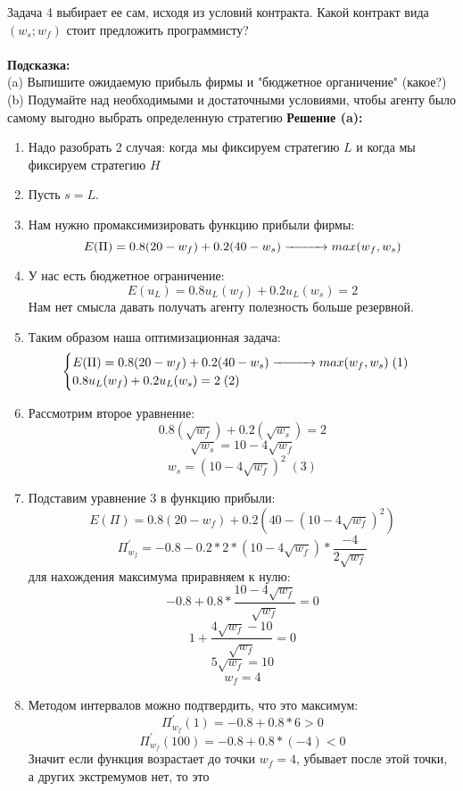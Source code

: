 \begin{mybox}{Задача 4}
    выбирает ее сам, исходя из условий контракта. Какой контракт вида $(w_s;w_f)$ стоит предложить программисту?\\\\
    \textbf{Подсказка:}\\
    \indent\setlength{\parindent}{1em}(a) Выпишите ожидаемую прибыль фирмы и "бюджетное органичение" (какое?)\\
    \indent\setlength{\parindent}{1em}(b) Подумайте над необходимыми и достаточными условиями, чтобы агенту было
    самому выгодно выбрать определенную стратегию
    \tcblower
    \textbf{Решение (a):}
    \begin{enumerate}
        \item Надо разобрать 2 случая: когда мы фиксируем стратегию $L$ и когда мы фиксируем стратегию $H$
        \item Пусть $s=L$.
        \item Нам нужно промаксимизировать функцию прибыли фирмы: $$E(\Pi)=0.8(20-w_f)+0.2(40-w_s)\xrightarrow{\makebox[1cm]{}} max(w_f,w_s)$$
        \item У нас есть бюджетное ограничение: $$E(u_L)=0.8u_L(w_f)+0.2u_L(w_s)=2$$ Нам нет смысла давать получать
        агенту полезность больше резервной.
        \item Таким образом наша оптимизационная задача: $$\begin{cases}
            E(\Pi)=0.8(20-w_f)+0.2(40-w_s)\xrightarrow{\makebox[1cm]{}} max(w_f,w_s) \;(1)\\
            0.8u_L(w_f)+0.2u_L(w_s)=2\; (2) \\
        \end{cases}$$
        \item Рассмотрим второе уравнение: $$0.8(\sqrt{w_f})+0.2(\sqrt{w_s})=2$$
        $$\sqrt{w_s}=10-4\sqrt{w_f}$$
        $$w_s=(10-4\sqrt{w_f})^2\;(3)$$
        \item Подставим уравнение 3 в функцию прибыли: $$E(\Pi)=0.8(20-w_f)+0.2(40-(10-4\sqrt{w_f})^2)$$
        $$\Pi^{'}_{w_f}=-0.8-0.2*2*(10-4\sqrt{w_f})*\frac{-4}{2\sqrt{w_f}}$$ для нахождения максимума приравняем к
        нулю:
        $$-0.8+0.8*\frac{10-4\sqrt{w_f}}{\sqrt{w_f}}=0$$
        $$1+\frac{4\sqrt{w_f}-10}{\sqrt{w_f}}=0$$
        $$5\sqrt{w_f}=10$$
        $$w_f=4$$
        \item Методом интервалов можно подтвердить, что это максимум:
        $$\Pi^{'}_{w_f}(1)=-0.8+0.8*6>0$$
        $$\Pi^{'}_{w_f}(100)=-0.8+0.8*(-4)<0$$
        Значит если функция возрастает до точки $w_f=4$, убывает после этой точки, а других экстремумов нет, то это

\end{enumerate}
\end{mybox}
